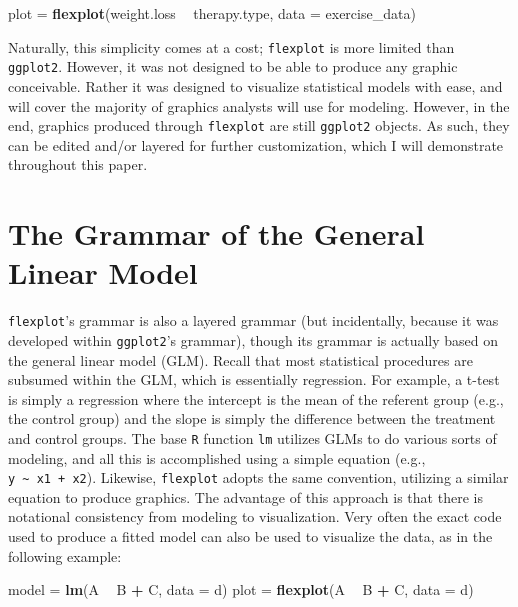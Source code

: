 \documentclass[
  man]{apa6}
\newenvironment{Shaded}{\begin{snugshade}}{\end{snugshade}}
\newcommand{\DataTypeTok}[1]{\textcolor[rgb]{0.13,0.29,0.53}{#1}}
\newcommand{\KeywordTok}[1]{\textcolor[rgb]{0.13,0.29,0.53}{\textbf{#1}}}
\newcommand{\NormalTok}[1]{#1}
\newcommand{\OperatorTok}[1]{\textcolor[rgb]{0.81,0.36,0.00}{\textbf{#1}}}
\newcommand{\StringTok}[1]{\textcolor[rgb]{0.31,0.60,0.02}{#1}}
\begin{document}
\begin{Shaded}
\begin{Highlighting}[]
\NormalTok{plot =}\StringTok{ }\KeywordTok{flexplot}\NormalTok{(weight.loss }\OperatorTok{~}\StringTok{ }\NormalTok{therapy.type, }\DataTypeTok{data =}\NormalTok{ exercise_data)}
\end{Highlighting}
\end{Shaded}

Naturally, this simplicity comes at a cost; \texttt{flexplot} is more limited than \texttt{ggplot2}. However, it was not designed to be able to produce any graphic conceivable. Rather it was designed to visualize statistical models with ease, and will cover the majority of graphics analysts will use for modeling. However, in the end, graphics produced through \texttt{flexplot} are still \texttt{ggplot2} objects. As such, they can be edited and/or layered for further customization, which I will demonstrate throughout this paper.

\hypertarget{the-grammar-of-the-general-linear-model}{%
\section{The Grammar of the General Linear Model}\label{the-grammar-of-the-general-linear-model}}

\texttt{flexplot}'s grammar is also a layered grammar (but incidentally, because it was developed within \texttt{ggplot2}'s grammar), though its grammar is actually based on the general linear model (GLM). Recall that most statistical procedures are subsumed within the GLM, which is essentially regression. For example, a t-test is simply a regression where the intercept is the mean of the referent group (e.g., the control group) and the slope is simply the difference between the treatment and control groups. The base \texttt{R} function \texttt{lm} utilizes GLMs to do various sorts of modeling, and all this is accomplished using a simple equation (e.g., \texttt{y\ \textasciitilde{}\ x1\ +\ x2}). Likewise, \texttt{flexplot} adopts the same convention, utilizing a similar equation to produce graphics. The advantage of this approach is that there is notational consistency from modeling to visualization. Very often the exact code used to produce a fitted model can also be used to visualize the data, as in the following example:

\begin{Shaded}
\begin{Highlighting}[]
\NormalTok{model =}\StringTok{       }\KeywordTok{lm}\NormalTok{(A }\OperatorTok{~}\StringTok{ }\NormalTok{B }\OperatorTok{+}\StringTok{ }\NormalTok{C, }\DataTypeTok{data =}\NormalTok{ d)}
\NormalTok{plot  =}\StringTok{ }\KeywordTok{flexplot}\NormalTok{(A }\OperatorTok{~}\StringTok{ }\NormalTok{B }\OperatorTok{+}\StringTok{ }\NormalTok{C, }\DataTypeTok{data =}\NormalTok{ d)}
\end{Highlighting}
\end{Shaded}
\end{document}
